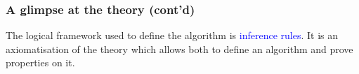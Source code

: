 \documentclass[compress,dvips,xcolor={dvipsnames},t]{beamer}
\newcommand\el{[\,]}
\newcommand\subterms[1]{t_{#1}}
\newcommand\cons[2]{[{#1}\mid{#2}]}
\begin{document}
% 
\begin{frame}
\frametitle{A glimpse at the theory (cont'd)}


The logical framework used to define the algorithm is
\textcolor{blue}{inference rules}. It is an axiomatisation of the theory which
allows both to define an algorithm and prove properties on it.


\end{frame}

\end{document}

